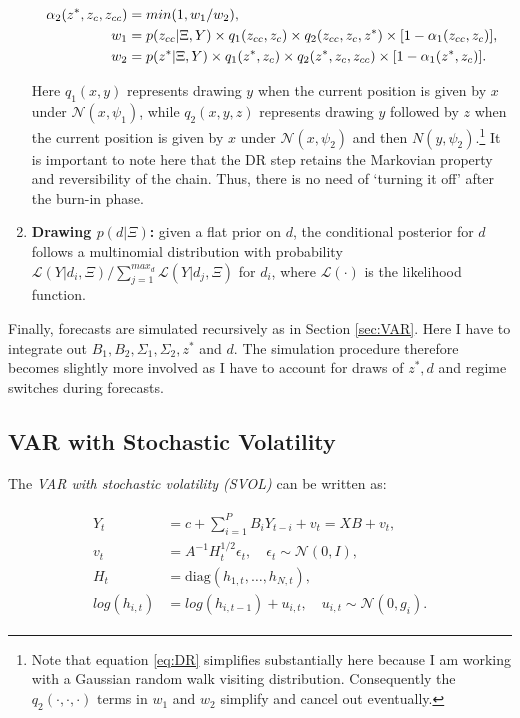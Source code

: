 \documentclass[12pt,letterpaper,fleqn]{article}           %
\begin{document}
\begin{enumerate}
\begin{align}
\alpha_2(z^*, z_c, z_{cc}) &= min(1, w_1 / w_2), \label{eq:DR} \\
w_1 &= p(z_{cc}| \Xi, Y) \times q_1(z_{cc}, z_c) \times q_2(z_{cc}, z_{c}, z^*) \times [1 - \alpha_1(z_{cc}, z_c)], \notag \\
w_2 &= p(z^*| \Xi,Y) \times q_1(z^*, z_c) \times q_2(z^*, z_{c}, z_{cc}) \times [1 - \alpha_1(z^*, z_c)] \notag.
\end{align}

Here $q_1(x, y)$ represents drawing $y$ when the current position is given by $x$ under $\mathcal{N}(x, \psi_1)$, while $q_2(x, y, z)$ represents drawing $y$ followed by $z$ when the current position is given by $x$ under $\mathcal{N}(x, \psi_2)$ and then $N(y, \psi_2)$.\footnote{Note that equation \eqref{eq:DR} simplifies substantially here because I am working with a Gaussian random walk visiting distribution. Consequently the $q_2(\cdot,\cdot,\cdot)$ terms in $w_1$ and $w_2$ simplify and cancel out eventually.}
It is important to note here that the DR step retains the Markovian property and reversibility of the chain. Thus, there is no need of `turning it off' after the burn-in phase. 
\item \textbf{Drawing $p(d|\Xi)$:} given a flat prior on $d$, the conditional posterior for $d$ follows a multinomial distribution with probability $\mathcal{L}(Y | d_i, \Xi) / \sum_{j=1}^{max_d} \mathcal{L}(Y | d_j, \Xi)$ for $d_i$, where $\mathcal{L}(\cdot)$ is the likelihood function.
\end{enumerate}    

Finally, forecasts are simulated recursively as in Section \ref{sec:VAR}. Here I have to integrate out $B_1, B_2, \Sigma_1, \Sigma_2, z^*$ and $d$. The simulation procedure therefore becomes slightly more involved as I have to account for draws of $z^*, d$ and regime switches during forecasts.

\subsection{VAR with Stochastic Volatility}
\label{sec:SVOL}

The \textit{VAR with stochastic volatility (SVOL)} can be written as:

\begin{align}
\begin{split}
Y_t &= c + \sum_{i=1}^P B_i Y_{t-i} + v_t = XB + v_t, \\
v_t &= A^{-1} H_t^{1/2} \epsilon_t, \quad \epsilon_t \sim \mathcal{N}(0, I), \\
H_t &= \mbox{diag}(h_{1,t},\ldots,h_{N,t}), \\
log(h_{i,t}) &= log(h_{i,t-1}) + u_{i,t}, \quad u_{i,t} \sim \mathcal{N}(0, g_i).
\end{split}
\label{eq:svol}
\end{align}
\end{document}
